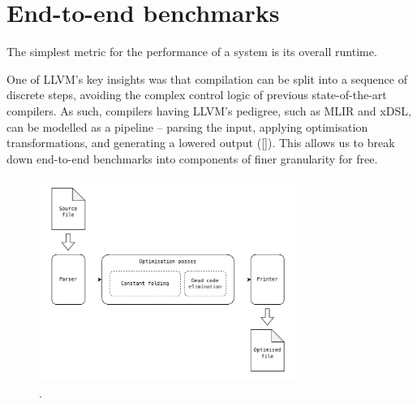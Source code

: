 \section{End-to-end benchmarks}

The simplest metric for the performance of a system is its overall runtime.

One of LLVM's key insights was that compilation can be split into a sequence of discrete steps, avoiding the complex control logic of previous state-of-the-art compilers.
As such, compilers having LLVM's pedigree, such as MLIR and xDSL, can be modelled as a pipeline -- parsing the input, applying optimisation transformations, and generating a lowered output (\autoref{}).
This allows us to break down end-to-end benchmarks into components of finer granularity for free.


\begin{figure}
    \centering
    \includegraphics[width=0.75\textwidth]{images/14_measuring_compiler_performance/compiler_phases.drawio.pdf}
    \caption{.}
    \label{fig:}
\end{figure}










